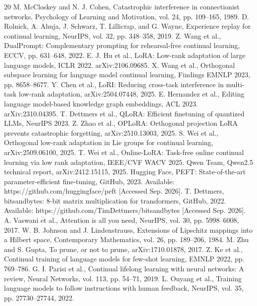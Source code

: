 \documentclass[10pt,journal,compsoc]{IEEEtran}
\begin{document}
\begin{thebibliography}{20}
 M. McCloskey and N. J. Cohen, Catastrophic interference in connectionist networks, Psychology of Learning and Motivation, vol. 24, pp. 109--165, 1989.
 D. Rolnick, A. Ahuja, J. Schwarz, T. Lillicrap, and G. Wayne, Experience replay for continual learning, NeurIPS, vol. 32, pp. 348--358, 2019.
 Z. Wang et al., DualPrompt: Complementary prompting for rehearsal-free continual learning, ECCV, pp. 631--648, 2022.
 E. J. Hu et al., LoRA: Low-rank adaptation of large language models, ICLR 2022. arXiv:2106.09685.
 X. Wang et al., Orthogonal subspace learning for language model continual learning, Findings EMNLP 2023, pp. 8658--8677.
 Y. Chen et al., LoRI: Reducing cross-task interference in multi-task low-rank adaptation, arXiv:2504.07448, 2025.
 E. Hernandez et al., Editing language model-based knowledge graph embeddings, ACL 2023. arXiv:2310.04395.
 T. Dettmers et al., QLoRA: Efficient finetuning of quantized LLMs, NeurIPS 2023.
 Z. Zhao et al., OPLoRA: Orthogonal projection LoRA prevents catastrophic forgetting, arXiv:2510.13003, 2025.
 S. Wei et al., Orthogonal low-rank adaptation in Lie groups for continual learning, arXiv:2509.06100, 2025.
 T. Wei et al., Online-LoRA: Task-free online continual learning via low rank adaptation, IEEE/CVF WACV 2025.
 Qwen Team, Qwen2.5 technical report, arXiv:2412.15115, 2025.
 Hugging Face, PEFT: State-of-the-art parameter-efficient fine-tuning, GitHub, 2023. Available: https://github.com/huggingface/peft [Accessed Sep. 2026].
 T. Dettmers, bitsandbytes: 8-bit matrix multiplication for transformers, GitHub, 2022. Available: https://github.com/TimDettmers/bitsandbytes [Accessed Sep. 2026].
 A. Vaswani et al., Attention is all you need, NeurIPS, vol. 30, pp. 5998--6008, 2017.
 W. B. Johnson and J. Lindenstrauss, Extensions of Lipschitz mappings into a Hilbert space, Contemporary Mathematics, vol. 26, pp. 189--206, 1984.
 M. Zhu and S. Gupta, To prune, or not to prune, arXiv:1710.01878, 2017.
 Z. Ke et al., Continual training of language models for few-shot learning, EMNLP 2022, pp. 769--786.
 G. I. Parisi et al., Continual lifelong learning with neural networks: A review, Neural Networks, vol. 113, pp. 54--71, 2019.
 L. Ouyang et al., Training language models to follow instructions with human feedback, NeurIPS, vol. 35, pp. 27730--27744, 2022.
\end{thebibliography}
\end{document}

